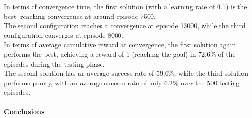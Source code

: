 \documentclass{article}
\begin{document}
\begin{center}
\centering
{}
\end{center}

\begin{center}
\centering
{}
\end{center}

\clearpage


In terms of convergence time, the first solution (with a learning rate of 0.1) is the best, reaching convergence at around episode 7500.
\\
The second configuration reaches a convergence at episode 13000, while the third configuration converges at episode 8000.
\\
In terms of average cumulative reward at convergence, the first solution again performs the best, achieving a reward of 1 (reaching the goal) in 72.6\% of the episodes during the testing phase.
\\
The second solution has an average success rate of 59.6\%, while the third solution performs poorly, with an average success rate of only 6.2\% over the 500 testing episodes.

\paragraph{Conclusions}
\end{document}
